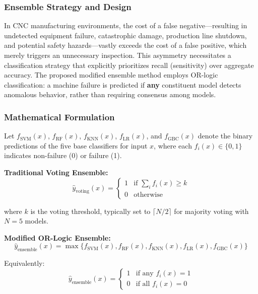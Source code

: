 \documentclass[final,5p, twocolumn]{elsarticle}
\begin{document}
\subsubsection{Ensemble Strategy and Design}

In CNC manufacturing environments, the cost of a false negative—resulting in undetected equipment failure, catastrophic damage, production line shutdown, and potential safety hazards—vastly exceeds the cost of a false positive, which merely triggers an unnecessary inspection. This asymmetry necessitates a classification strategy that explicitly prioritizes recall (sensitivity) over aggregate accuracy. The proposed modified ensemble method employs OR-logic classification: a machine failure is predicted if \textbf{any} constituent model detects anomalous behavior, rather than requiring consensus among models.

\subsubsection{Mathematical Formulation}

Let $f_{\text{SVM}}(x)$, $f_{\text{RF}}(x)$, $f_{\text{KNN}}(x)$, $f_{\text{LR}}(x)$, and $f_{\text{GBC}}(x)$ denote the binary predictions of the five base classifiers for input $x$, where each $f_i(x) \in \{0, 1\}$ indicates non-failure (0) or failure (1).

\textbf{Traditional Voting Ensemble:}
\begin{equation}
\hat{y}_{\text{voting}}(x) = \begin{cases} 
1 & \text{if } \sum_{i} f_i(x) \geq k \\
0 & \text{otherwise}
\end{cases}
\end{equation}

where $k$ is the voting threshold, typically set to $\lceil N/2 \rceil$ for majority voting with $N=5$ models.

\textbf{Modified OR-Logic Ensemble:}
\begin{equation}
\hat{y}_{\text{ensemble}}(x) = \max\{f_{\text{SVM}}(x), f_{\text{RF}}(x), f_{\text{KNN}}(x), f_{\text{LR}}(x), f_{\text{GBC}}(x)\}
\end{equation}

Equivalently:
\begin{equation}
\hat{y}_{\text{ensemble}}(x) = \begin{cases} 
1 & \text{if any } f_i(x) = 1 \\
0 & \text{if all } f_i(x) = 0
\end{cases}
\end{equation}
\end{document}
